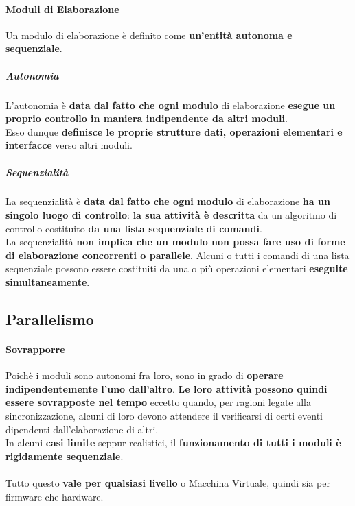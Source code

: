 \documentclass[10pt]{report}
\begin{document}
\paragraph{Moduli di Elaborazione} Un modulo di elaborazione è definito come \textbf{un'entità autonoma e sequenziale}.
\subparagraph{Autonomia} L'autonomia è \textbf{data dal fatto che ogni modulo} di elaborazione \textbf{esegue un proprio controllo in maniera indipendente da altri moduli}.\\
Esso dunque \textbf{definisce le proprie strutture dati, operazioni elementari e interfacce} verso altri moduli.
\subparagraph{Sequenzialità} La sequenzialità è \textbf{data dal fatto che ogni modulo} di elaborazione \textbf{ha un singolo luogo di controllo}: \textbf{la sua attività è descritta} da un algoritmo di controllo costituito \textbf{da una lista sequenziale di comandi}.\\
La sequenzialità \textbf{non implica che un modulo non possa fare uso di forme di elaborazione concorrenti o parallele}. Alcuni o tutti i comandi di una lista sequenziale possono essere costituiti da una o più operazioni elementari \textbf{eseguite simultaneamente}.
\subsection{Parallelismo}
\paragraph{Sovrapporre} Poichè i moduli sono autonomi fra loro, sono in grado di \textbf{operare indipendentemente l'uno dall'altro}. \textbf{Le loro attività possono quindi essere sovrapposte nel tempo} eccetto quando, per ragioni legate alla sincronizzazione, alcuni di loro devono attendere il verificarsi di certi eventi dipendenti dall'elaborazione di altri.\\
In alcuni \textbf{casi limite} seppur realistici, il \textbf{funzionamento di tutti i moduli è rigidamente sequenziale}.\\\\
Tutto questo \textbf{vale per qualsiasi livello} o Macchina Virtuale, quindi sia per firmware che hardware.
\pagebreak
\end{document}
